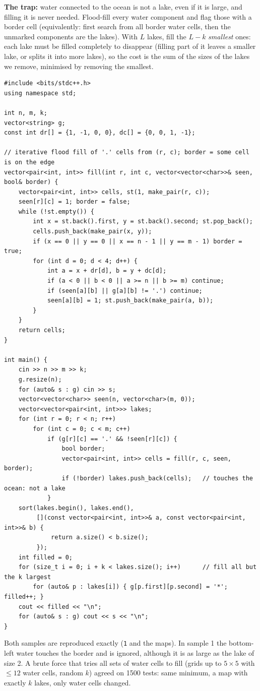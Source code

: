 \begin{solutionbox}
\textbf{The trap:} water connected to the ocean is not a lake, even if it is large, and filling it is never needed. Flood-fill every water component and flag those with a border cell (equivalently: first search from all border water cells, then the unmarked components are the lakes). With $L$ lakes, fill the $L - k$ \emph{smallest} ones: each lake must be filled completely to disappear (filling part of it leaves a smaller lake, or splits it into more lakes), so the cost is the sum of the sizes of the lakes we remove, minimised by removing the smallest.
\begin{lstlisting}[style=cpp]
#include <bits/stdc++.h>
using namespace std;

int n, m, k;
vector<string> g;
const int dr[] = {1, -1, 0, 0}, dc[] = {0, 0, 1, -1};

// iterative flood fill of '.' cells from (r, c); border = some cell is on the edge
vector<pair<int, int>> fill(int r, int c, vector<vector<char>>& seen, bool& border) {
    vector<pair<int, int>> cells, st(1, make_pair(r, c));
    seen[r][c] = 1; border = false;
    while (!st.empty()) {
        int x = st.back().first, y = st.back().second; st.pop_back();
        cells.push_back(make_pair(x, y));
        if (x == 0 || y == 0 || x == n - 1 || y == m - 1) border = true;
        for (int d = 0; d < 4; d++) {
            int a = x + dr[d], b = y + dc[d];
            if (a < 0 || b < 0 || a >= n || b >= m) continue;
            if (seen[a][b] || g[a][b] != '.') continue;
            seen[a][b] = 1; st.push_back(make_pair(a, b));
        }
    }
    return cells;
}

int main() {
    cin >> n >> m >> k;
    g.resize(n);
    for (auto& s : g) cin >> s;
    vector<vector<char>> seen(n, vector<char>(m, 0));
    vector<vector<pair<int, int>>> lakes;
    for (int r = 0; r < n; r++)
        for (int c = 0; c < m; c++)
            if (g[r][c] == '.' && !seen[r][c]) {
                bool border;
                vector<pair<int, int>> cells = fill(r, c, seen, border);
                if (!border) lakes.push_back(cells);   // touches the ocean: not a lake
            }
    sort(lakes.begin(), lakes.end(),
         [](const vector<pair<int, int>>& a, const vector<pair<int, int>>& b) {
             return a.size() < b.size();
         });
    int filled = 0;
    for (size_t i = 0; i + k < lakes.size(); i++)      // fill all but the k largest
        for (auto& p : lakes[i]) { g[p.first][p.second] = '*'; filled++; }
    cout << filled << "\n";
    for (auto& s : g) cout << s << "\n";
}
\end{lstlisting}
Both samples are reproduced exactly (\texttt{1} and the maps). In sample 1 the bottom-left water touches the border and is ignored, although it is as large as the lake of size 2. A brute force that tries all sets of water cells to fill (grids up to $5 \times 5$ with $\le 12$ water cells, random $k$) agreed on 1500 tests: same minimum, a map with exactly $k$ lakes, only water cells changed.
\end{solutionbox}

